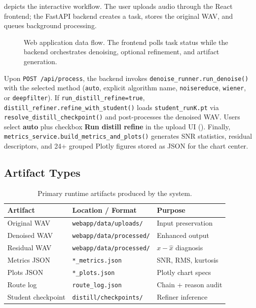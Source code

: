  depicts the interactive workflow. The user uploads audio through the React frontend; the FastAPI backend creates a task, stores the original WAV, and queues background processing.

\begin{figure}[H]
  \centering
  \resizebox{0.92\textwidth}{!}{%
  }
  \caption{Web application data flow. The frontend polls task status while the backend orchestrates denoising, optional refinement, and artifact generation.}
  \label{fig:web_dataflow}
\end{figure}

Upon \texttt{POST /api/process}, the backend invokes \texttt{denoise\_runner.run\_denoise()} with the selected method (\texttt{auto}, explicit algorithm name, \texttt{noisereduce}, \texttt{wiener}, or \texttt{deepfilter}). If \texttt{run\_distill\_refine=true}, \texttt{distill\_refiner.refine\_with\_student()} loads \texttt{student\_runK.pt} via \texttt{resolve\_distill\_checkpoint()} and post-processes the denoised WAV. Users select \textbf{auto} plus checkbox \textbf{Run distill refine} in the upload UI (). Finally, \texttt{metrics\_service.build\_metrics\_and\_plots()} generates SNR statistics, residual descriptors, and 24+ grouped Plotly figures stored as JSON for the chart center.

\subsection{Artifact Types}

\begin{table}[H]
  \centering
  \caption{Primary runtime artifacts produced by the system.}
  \label{tab:artifacts}
  \begin{tabular}{lll}
    \toprule
    \textbf{Artifact} & \textbf{Location / Format} & \textbf{Purpose} \\
    \midrule
    Original WAV       & \texttt{webapp/data/uploads/}     & Input preservation \\
    Denoised WAV       & \texttt{webapp/data/processed/}   & Enhanced output \\
    Residual WAV       & \texttt{webapp/data/processed/}   & $x - \hat{x}$ diagnosis \\
    Metrics JSON       & \texttt{*\_metrics.json}          & SNR, RMS, kurtosis \\
    Plots JSON         & \texttt{*\_plots.json}            & Plotly chart specs \\
    Route log          & \texttt{route\_log.json}          & Chain + reason audit \\
    Student checkpoint & \texttt{distill/checkpoints/}     & Refiner inference \\
    \bottomrule
  \end{tabular}
\end{table}

